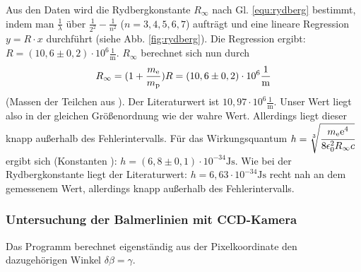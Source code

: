 Aus den Daten wird die Rydbergkonstante $R_\infty$ nach Gl. \ref{equ:rydberg} bestimmt, indem man $\frac{1}{\lambda}$ über $\frac{1}{2^2}-\frac{1}{n^2}$ ($n = 3,4,5,6,7$) aufträgt und eine lineare Regression $y = R \cdot x$ durchführt (siehe Abb. \ref{fig:rydberg}). Die Regression ergibt: $R = (10,6 \pm 0,2)\cdot 10^6\frac{1}{\si{\metre}}$. $R_\infty$ berechnet sich nun durch \[R_\infty = (1+\frac{m_\mathrm{e}}{m_\mathrm{p}}) R = (10,6 \pm 0,2)\cdot 10^6\frac{1}{\si{\metre}}\] (Massen der Teilchen aus \cite{wiki_konst}). Der Literaturwert ist $10,97 \cdot 10^6\frac{1}{\si{\metre}}$\cite{wiki_konst}. Unser Wert liegt also in der gleichen Größenordnung wie der wahre Wert. Allerdings liegt dieser knapp außerhalb des Fehlerintervalls. Für das Wirkungsquantum $h = \sqrt[3]{\cfrac{m_\mathrm{e}\mathrm{e}^4}{8\epsilon_0^2R_\infty c}}$ ergibt sich (Konstanten \cite{wiki_konst}): $h = (6,8 \pm 0,1) \cdot 10^{-34} \si{\joule \second}$. Wie bei der Rydbergkonstante liegt der Literaturwert: $h = 6,63 \cdot 10^{-34} \si{\joule \second}$ recht nah an dem gemessenem Wert, allerdings knapp außerhalb des Fehlerintervalls.

\subsubsection{Untersuchung der Balmerlinien mit CCD-Kamera}
Das Programm berechnet eigenständig aus der Pixelkoordinate den dazugehörigen Winkel $\delta  \beta = \gamma$. 

